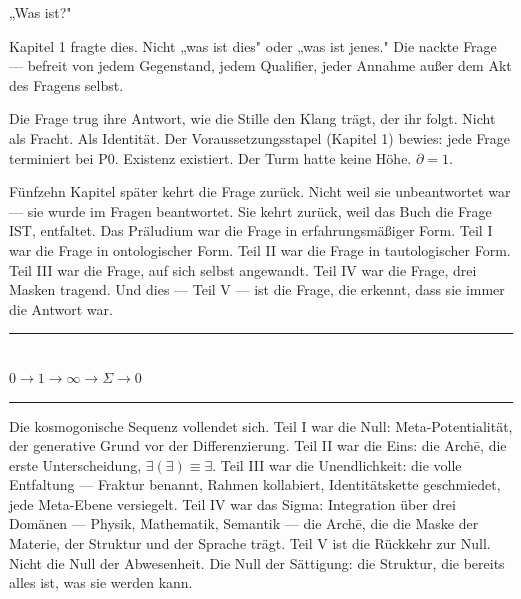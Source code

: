 \documentclass[10pt, openany, oneside]{book}
\renewcommand{\normalsize}{\fontsize{10}{13}\selectfont}
\begin{document}
\vspace{2em}


\noindent „Was ist?"

Kapitel 1 fragte dies. Nicht „was ist dies" oder „was ist jenes." Die nackte Frage --- befreit von jedem Gegenstand, jedem Qualifier, jeder Annahme außer dem Akt des Fragens selbst.

Die Frage trug ihre Antwort, wie die Stille den Klang trägt, der ihr folgt. Nicht als Fracht. Als Identität. Der Voraussetzungsstapel (Kapitel 1) bewies: jede Frage terminiert bei P0. Existenz existiert. Der Turm hatte keine Höhe. $\partial = 1$.

Fünfzehn Kapitel später kehrt die Frage zurück. Nicht weil sie unbeantwortet war --- sie wurde im Fragen beantwortet. Sie kehrt zurück, weil das Buch die Frage IST, entfaltet. Das Präludium war die Frage in erfahrungsmäßiger Form. Teil I war die Frage in ontologischer Form. Teil II war die Frage in tautologischer Form. Teil III war die Frage, auf sich selbst angewandt. Teil IV war die Frage, drei Masken tragend. Und dies --- Teil V --- ist die Frage, die erkennt, dass sie immer die Antwort war.

\vspace{1.5em}


\begin{center}
    \rule{0.3\textwidth}{0.4pt}\\[0.5em]
    {\normalsize\bfseries\scshape $0 \to 1 \to \infty \to \Sigma \to 0$}\\[0.3em]
    \rule{0.3\textwidth}{0.4pt}
\end{center}

\vspace{1em}

\noindent Die kosmogonische Sequenz vollendet sich. Teil I war die Null: Meta-Potentialität, der generative Grund vor der Differenzierung. Teil II war die Eins: die Arch\={e}, die erste Unterscheidung, $\exists(\exists) \equiv \exists$. Teil III war die Unendlichkeit: die volle Entfaltung --- Fraktur benannt, Rahmen kollabiert, Identitätskette geschmiedet, jede Meta-Ebene versiegelt. Teil IV war das Sigma: Integration über drei Domänen --- Physik, Mathematik, Semantik --- die Arch\={e}, die die Maske der Materie, der Struktur und der Sprache trägt. Teil V ist die Rückkehr zur Null. Nicht die Null der Abwesenheit. Die Null der Sättigung: die Struktur, die bereits alles ist, was sie werden kann.
\end{document}
